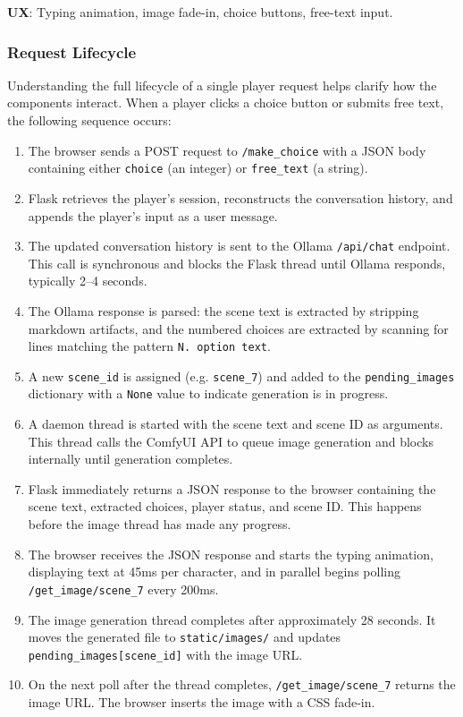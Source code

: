\documentclass[12pt,a4paper]{article}
\newcommand{\breakablegetimage}[1]{\texttt{/get\_image/}\allowbreak\texttt{#1}}
\begin{document}
\textbf{UX}: Typing animation, image fade-in, choice buttons, free-text input.

\subsubsection{Request Lifecycle}

Understanding the full lifecycle of a single player request helps clarify how the components interact. When a player clicks a choice button or submits free text, the following sequence occurs:

\begin{enumerate}
    \item The browser sends a POST request to \texttt{/make\_choice} with a JSON body containing either \texttt{choice} (an integer) or \texttt{free\_text} (a string).
    \item Flask retrieves the player's session, reconstructs the conversation history, and appends the player's input as a user message.
    \item The updated conversation history is sent to the Ollama \texttt{/api/chat} endpoint. This call is synchronous and blocks the Flask thread until Ollama responds, typically 2--4 seconds.
    \item The Ollama response is parsed: the scene text is extracted by stripping markdown artifacts, and the numbered choices are extracted by scanning for lines matching the pattern \texttt{N. option text}.
    \item A new \texttt{scene\_id} is assigned (e.g. \texttt{scene\_7}) and added to the \texttt{pending\_images} dictionary with a \texttt{None} value to indicate generation is in progress.
    \item A daemon thread is started with the scene text and scene ID as arguments. This thread calls the ComfyUI API to queue image generation and blocks internally until generation completes.
    \item Flask immediately returns a JSON response to the browser containing the scene text, extracted choices, player status, and scene ID. This happens before the image thread has made any progress.
    \item The browser receives the JSON response and starts the typing animation, displaying text at 45ms per character, and in parallel begins polling \breakablegetimage{scene\_7} every 200ms.
    \item The image generation thread completes after approximately 28 seconds. It moves the generated file to \texttt{static/images/} and updates \texttt{pending\_images[scene\_id]} with the image URL.
    \item On the next poll after the thread completes, \breakablegetimage{scene\_7} returns the image URL. The browser inserts the image with a CSS fade-in.
\end{enumerate}
\end{document}
